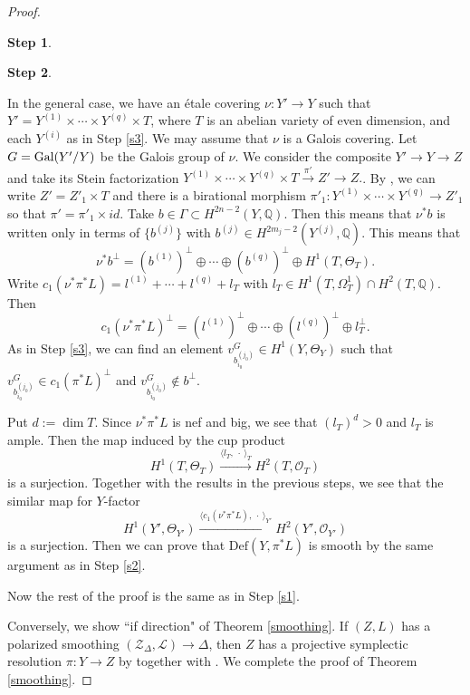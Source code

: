 \documentclass[12pt,a4paper]{amsart}
\theoremstyle{remark}
\theoremstyle{definition}
\newtheorem{Step}{Step}
\def\dim{\operatorname{dim}}
\begin{document}
\begin{proof}
\begin{Step}
\end{Step}
\begin{Step}\label{s4} %

In the general case, we have an  \'etale covering $\nu\colon Y' \to Y$ such that 
$Y' =  Y^{(1)} \times \cdots  \times Y^{(q)} \times T$, where $T$ is an abelian variety of even dimension, 
and each $Y^{(i)}$ as in Step \ref{s3}. 
We may assume that $\nu$ is a Galois covering. Let $G={\rm Gal}(Y'/Y)$ 
be the Galois group of $\nu$. 
We consider the composite $Y' \to Y \to Z$ and take its Stein factorization $Y^{(1)} \times \cdots  \times Y^{(q)} \times T \stackrel{\pi'}\to Z' \to Z.$. By \cite[Lemma 4.6]{Druel}, 
we can write $Z' = Z'_1 \times T$ and there is a birational morphism $\pi'_1: Y^{(1)} \times \cdots  \times Y^{(q)} \to Z'_1$ so 
that $\pi' = \pi'_1 \times id$. Take $b \in \Gamma \subset H^{2n-2}(Y, \mathbb{Q})$. Then this means that $\nu^*b$ is written only 
in terms of $\{b^{(j)}\}$ with $b^{(j)} \in H^{2m_j -2}(Y^{(j)}, \mathbb{Q})$. 
This means that $$\nu^*b^{\perp} = (b^{(1)})^{\perp} \oplus \cdots  \oplus (b^{(q)})^{\perp} \oplus H^1(T, \Theta_T).$$ 
Write $c_1(\nu^*\pi^*L) = l^{(1)} + \cdots  + l^{(q)} + l_T$ with $l_T \in H^1(T, \Omega^1_T) \cap H^2(T, \mathbb{Q})$. 
Then $$c_1(\nu^*\pi^*L)^{\perp} = (l^{(1)})^{\perp} \oplus \cdots  \oplus (l^{(q)})^{\perp} \oplus l_T^{\perp}.$$
As in Step \ref{s3}, 
we can find an element $v^G_{{b_{i_0}^{(j_0)}}} \in H^1(Y, \Theta_Y)$ such that 
$v^G_{{b_{i_0}^{(j_0)}}} \in c_1(\pi^*L)^{\perp}$ and $v^G_{{b_{i_0}^{(j_0)}}} \notin b^{\perp}$.
 
Put $d := \dim T$. Since $\nu^*\pi^*L$ is nef and big, we see that $(l_T)^d > 0$ and $l_T$ is ample. Then the map induced by the 
cup product 
$$H^1(T, \Theta_T) \stackrel{\langle l_T, \: \cdot \:  \rangle_T}\longrightarrow H^2(T, \mathcal{O}_T)$$ is a surjection. 
Together with the results in the previous steps, we see that the 
similar map for $Y$-factor 
$$H^1(Y', \Theta_{Y'}) \stackrel{\langle c_1(\nu^*\pi^*L), \: \cdot \: \rangle_{Y'}}\longrightarrow H^2(Y', \mathcal{O}_{Y'})$$ is a surjection. Then we can prove that $\mathrm{Def}(Y, \pi^*L)$ is smooth 
by the same argument as in 
Step \ref{s2}. 

Now the rest of the proof is the same as in Step \ref{s1}. 

\end{Step}

Conversely, we show ``if direction" 
of Theorem \ref{smoothing}. 
If $(Z, L)$ has a polarized smoothing $(\mathcal{Z}_{\Delta}, \mathcal{L}) \to \Delta$, then 
$Z$ has a projective symplectic 
resolution $\pi: Y \to Z$ by 
\cite[Corollary 2]{Nam.def} together with \cite{BCHM}.  
We complete the proof of 
Theorem \ref{smoothing}. 
\end{proof}
\end{document}
